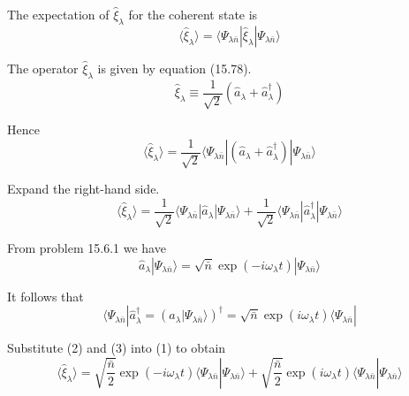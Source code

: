 


\bigskip
The expectation of $\hat\xi_\lambda$ for the coherent state is
\begin{equation*}
\langle\hat\xi_\lambda\rangle=\langle\Psi_{\lambda\bar n}|\hat\xi_\lambda|\Psi_{\lambda\bar n}\rangle
\end{equation*}

The operator $\hat\xi_\lambda$ is given by equation (15.78).
\begin{equation*}
\hat\xi_\lambda\equiv\frac{1}{\sqrt2}\left(\hat a_\lambda+\hat a_\lambda^\dag\right)
\tag{15.78}
\end{equation*}

Hence
\begin{equation*}
\langle\hat\xi_\lambda\rangle
=\frac{1}{\sqrt2}
\langle\Psi_{\lambda\bar n}|
\left(\hat a_\lambda+\hat a_\lambda^\dag\right)
|\Psi_{\lambda\bar n}\rangle
\end{equation*}

Expand the right-hand side.
\begin{equation*}
\langle\hat\xi_\lambda\rangle
=\frac{1}{\sqrt2}
\langle\Psi_{\lambda\bar n}|
\hat a_\lambda
|\Psi_{\lambda\bar n}\rangle
+\frac{1}{\sqrt2}
\langle\Psi_{\lambda\bar n}|
\hat a_\lambda^\dag
|\Psi_{\lambda\bar n}\rangle
\tag{1}
\end{equation*}

From problem 15.6.1 we have
\begin{equation*}
\hat a_\lambda|\Psi_{\lambda\bar n}\rangle
=\sqrt{\bar n}\exp(-i\omega_\lambda t)|\Psi_{\lambda\bar n}\rangle
\tag{2}
\end{equation*}

It follows that
\begin{equation*}
\langle\Psi_{\lambda\bar n}|\hat a_\lambda^\dag
=\left(\hat a_\lambda|\Psi_{\lambda\bar n}\rangle\right)^\dag
=\sqrt{\bar n}\exp(i\omega_\lambda t)\langle\Psi_{\lambda\bar n}|
\tag{3}
\end{equation*}

Substitute (2) and (3) into (1) to obtain
\begin{equation*}
\langle\hat\xi_\lambda\rangle
=\sqrt{\frac{\bar n}{2}}\exp(-i\omega_\lambda t)
\langle\Psi_{\lambda\bar n}|\Psi_{\lambda\bar n}\rangle
+\sqrt{\frac{\bar n}{2}}\exp(i\omega_\lambda t)
\langle\Psi_{\lambda\bar n}|\Psi_{\lambda\bar n}\rangle
\end{equation*}


